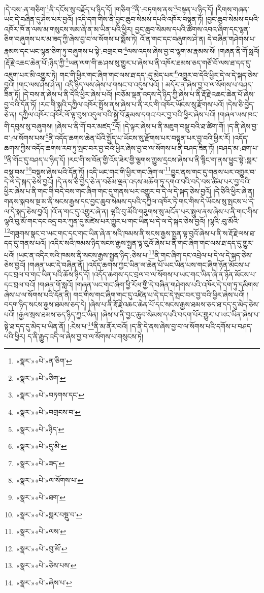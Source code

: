 །དེ་བས་:ན་གཅིག་\footnote{«སྣར་»«པེ་»ན་ཅིག་}ནི་དངོས་སུ་བརྗོད་པ་ཉིད་དོ། །གཅིག་\footnote{«སྣར་»«པེ་»ཅིག་}ནི་:བཏགས་ནས་\footnote{«སྣར་»«པེ་»བཏགས་དང་}བསྟན་པ་ཉིད་དོ། །རིགས་གཞན་ཡང་དེ་བཞིན་དུ་ཤེས་པར་བྱའོ། །འདི་དག་གིས་ནི་བྱང་ཆུབ་སེམས་དཔའི་འཁོར་བསྟན་ཏོ། །བྱང་ཆུབ་སེམས་དཔའི་འཁོར་ཁོ་ན་ལས་མ་གསུངས་སམ་ཞེ་ན་མ་ཡིན་པའི་ཕྱིར། བྱང་ཆུབ་སེམས་དཔའི་ཚོགས་འབའ་ཞིག་དང་ལྷན་ཅིག་བཞུགས་པར་མ་ཟད་ཀྱི་ཞེས་བྱ་བ་ལ་སོགས་པ་སྨོས་ཏེ། འོ་ན་གང་དང་བཞུགས་ཤེ་ན། དེ་བཞིན་གཤེགས་པ་རྣམས་དང་ཡང་ལྷན་ཅིག་ཏུ་བཞུགས་པ་སྟེ་:བགྲང་བ་\footnote{«སྣར་»«པེ་»བགྲངས་བ་}ལས་འདས་ཞེས་བྱ་བ་ལྷག་མ་རྣམས་སོ། །གཞན་ནི་གོ་སླའོ། །རྡོ་རྗེ་འཆང་ཆེན་པོ་:ཉིད་ཀྱི་\footnote{«སྣར་»«པེ་»ཉིད་}ཡན་ལག་གི་ཆ་ཤས་སུ་གྱུར་པ་ཞེས་པ་ནི་འཁོར་ཐམས་ཅད་གཙོ་བོ་ལས་ཐ་དད་དུ་འཇུག་པར་མི་འགྱུར་ཏེ། གང་གི་ཕྱིར་གང་ཞིག་གང་ལས་ཐ་དད་:དུ་མེད་པར་\footnote{«སྣར་»«པེ་»དུ་མི་}འགྱུར་བ་དེའི་ཕྱིར་དེ་ལ་དེ་སྐད་ཅེས་བྱའོ། །གང་ལས་ཤེས་ཤེ་ན། འདི་ཉིད་ལས་ཞེས་པ་གསང་བ་འདུས་པའོ། །
མདོར་ན་ཞེས་བྱ་བ་ལ་སོགས་པ་བཤད་ཟིན་ཏོ། །དེ་བས་ན་ཞེས་པ་ནི་དེའི་ཕྱིར་ཞེས་པའོ། །བཅོམ་ལྡན་འདས་དེ་ཉིད་ཀྱི་ཞེས་པ་ནི་རྡོ་རྗེ་འཆང་ཆེན་པོ་ཞེས་བྱ་བའི་དོན་ཏོ། །རང་གི་སྐུའི་དཀྱིལ་འཁོར་སྤྲོས་ནས་ཞེས་པ་ནི་རང་གི་འཁོར་ཡོངས་སུ་རྫོགས་པའོ། །དེས་ཅི་བྱེད་ཅེ་ན། དཀྱིལ་འཁོར་འཁོར་ལོ་ལྟ་བུས་འདུལ་བའི་སྐྱེ་བོ་རྣམས་དགའ་བར་བྱ་བའི་ཕྱིར་ཞེས་པའོ། །གཞལ་ཡས་ཁང་གི་དབུས་སུ་བཞུགས། །ཞེས་པ་ནི་གོ་བར་མཛད་\footnote{«སྣར་»«པེ་»ཟད་}དོ། །དེ་ལྟར་ཞེས་པ་ནི་མཇུག་བསྡུ་བའི་ཐ་ཚིག་གོ། །ད་ནི་ཞེས་བྱ་བ་:ལ་སོགས་པས་\footnote{«སྣར་»«པེ་»ལ་སོགས་པ་}ནི་འདོད་ཆགས་ཆེན་པོའི་སྤྱོད་པ་ཡོངས་སུ་རྫོགས་པར་བསྟན་པར་བྱ་བའི་ཕྱིར་རོ། །འདོད་ཆགས་ཀྱིས་འདོད་ཆགས་རབ་ཏུ་སྤང་བར་བྱ་བའི་ཕྱིར་ཞེས་བྱ་བ་ལ་སོགས་པ་ནི་བཤད་ཟིན་ཏོ། །བཤད་མ་:ཐག་པ་\footnote{«སྣར་»«པེ་»ཐག་}ནི་གོང་དུ་བཤད་པ་ཉིད་དོ། །རང་གི་ས་བོན་གྱི་འོད་ཟེར་གྱི་ལྕགས་ཀྱུས་དྲངས་ཞེས་པ་ནི་སྙིང་ག་ནས་ཕྱུང་སྟེ་:སླར་བསྡུ་བས་\footnote{«སྣར་»«པེ་»སླར་བསྡུ་བ་}བསྡུས་ཞེས་པའི་དོན་ཏོ། །འདི་ཡང་གང་གི་ཕྱིར་གང་ཞིག་ལ་\footnote{«སྣར་»«པེ་»ལས་}བྱུང་ནས་གང་དུ་གནས་པར་འགྱུར་བ་དེ་ལ་དེ་སྐད་ཅེས་བྱའོ། །དེ་ནས་ཅི་བྱེད་ཅེ་ན་བཅོམ་ལྡན་འདས་མཆོག་ཏུ་དགའ་བའི་བདེ་བས་ཚིམ་པར་བྱ་བའི་ཕྱིར་ཞེས་པ་ནི་གང་གི་བདེ་བས་གང་ཞིག་གང་དུ་གནས་པར་འགྱུར་བ་དེ་ལ་དེ་སྐད་ཅེས་བྱའོ། །དེ་ཅིའི་ཕྱིར་ཞེ་ན། གནས་སྐབས་སྔ་མ་ནི་སངས་རྒྱས་དང་བྱང་ཆུབ་སེམས་དཔའི་དཀྱིལ་འཁོར་ཏེ་གང་གིས་དེ་ཡོངས་སུ་སྤངས་པ་དེ་ལ་དེ་སྐད་ཅེས་བྱའོ། །འོ་ན་གང་དུ་འགྱུར་ཞེ་ན། ལྷའི་བུ་མོའི་གཟུགས་སུ་མངོན་པར་སྤྲུལ་ནས་ཞེས་པ་ནི་གང་གིས་ལྷའི་བུ་མོ་གང་དང་འདྲ་བར་ཀུན་དུ་མཛེས་པར་གྱུར་པ་གང་ཡིན་པ་དེ་ལ་དེ་སྐད་ཅེས་བྱའོ། །ལྷའི་:བུ་མོའི་\footnote{«སྣར་»«པེ་»བུ་མོ་}གཟུགས་སྣང་བ་ཡང་གང་དང་གང་ཡིན་ཞེ་ན་སའི་ཁམས་ནི་སངས་རྒྱས་སྤྱན་ལྟ་བུའོ་ཞེས་པ་ནི་ས་རྡོ་རྗེ་ལས་ཐ་དད་དུ་གནས་པའོ། །འདིར་སའི་ཁམས་ཉིད་སངས་རྒྱས་སྤྱན་ལྟ་བུའོ་ཞེས་པ་ནི་གང་ཞིག་གང་ལས་ཐ་དད་དུ་གྱུར་པའོ། །ཡང་ན་འདིར་སའི་ཁམས་ནི་སངས་རྒྱས་སྤྱན་ཉིད་:ཅེས་པ་\footnote{«སྣར་»«པེ་»ཅེས་པས་}ནི་གང་ཞིག་དང་འབྲེལ་པ་དེ་ལ་དེ་སྐད་ཅེས་ཅེས་བྱའོ། །གཞན་ཡང་དེ་བཞིན་ནོ། །འདོད་ཆགས་ཀྱང་ཡིན་ལ་ཆེན་པོ་ཡང་ཡིན་པས་གང་ཞིག་ཉོན་མོངས་པ་དང་བྲལ་བ་གང་ཡིན་པའི་ཆོས་ཉིད་དོ། །འདོད་ཆགས་དང་བྲལ་བ་ལ་སོགས་པ་ཡང་གང་ཡིན་ཞེ་ན་ཉོན་མོངས་པ་དང་བྲལ་བའོ། །གཞན་གོ་སླའོ། །གཞན་ཡང་གང་ཞིག་ཕྱི་རོལ་གྱི་དེ་བཞིན་གཤེགས་པའི་འཁོར་དེ་དག་ཏུ་དམིགས་ཞེས་པ་ལ་སོགས་པའི་དོན་ནི། གང་གིས་གང་ཞིག་གང་དུ་འཛིན་པ་དེ་དང་དེ་སྤང་བར་བྱ་བའི་ཕྱིར་ཞེས་པའོ། །བདག་ཉིད་སངས་རྒྱས་ཐམས་ཅད་དེ། །ཞེས་པ་ནི་རྡོ་རྗེ་འཆང་ཆེན་པོ་དང་སངས་རྒྱས་ཐམས་ཅད་ཐ་དད་དུ་མེད་ཅེས་པའོ། །རྒྱལ་སྲས་ཐམས་ཅད་ཉིད་ཀྱང་ཡིན། །ཞེས་པ་ནི་བྱང་ཆུབ་སེམས་དཔའི་བདག་པོར་གྱུར་པ་ཡང་ཡིན་ཞེས་པ་སྟེ་ཐ་དད་དུ་མེད་པ་ཡིན་ནོ། །:ངེས་པ་\footnote{«སྣར་»«པེ་»ཞེས་པ་}ནི་མ་ནོར་བའོ། །ད་ནི་དེ་ནས་ཞེས་བྱ་བ་ལ་སོགས་པའི་དགོས་པ་བཤད་པའི་ཕྱིར། ད་ནི་རྒྱུད་འདི་ལ་ཞེས་བྱ་བ་ལ་སོགས་པ་གསུངས་ཏེ། 